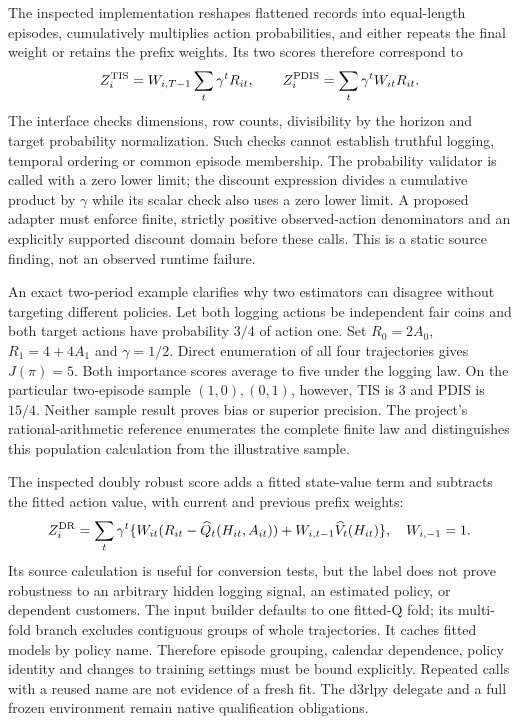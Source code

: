 The inspected implementation reshapes flattened records into equal-length
episodes, cumulatively multiplies action probabilities, and either repeats the
final weight or retains the prefix weights. Its two scores therefore correspond
to
\[
 Z_i^{\rm TIS}=W_{i,T-1}\sum_t\gamma^tR_{it},
 \qquad Z_i^{\rm PDIS}=\sum_t\gamma^tW_{it}R_{it}.
\]
The interface checks dimensions, row counts, divisibility by the horizon and
target probability normalization. Such checks cannot establish truthful
logging, temporal ordering or common episode membership. The probability
validator is called with a zero lower limit; the discount expression divides a
cumulative product by $\gamma$ while its scalar check also uses a zero lower
limit. A proposed adapter must enforce finite, strictly positive observed-action
denominators and an explicitly supported discount domain before these calls.
This is a static source finding, not an observed runtime failure.
\cite{exec23_scope_rl_sources}

An exact two-period example clarifies why two estimators can disagree without
targeting different policies. Let both logging actions be independent fair
coins and both target actions have probability $3/4$ of action one. Set
$R_0=2A_0$, $R_1=4+4A_1$ and $\gamma=1/2$. Direct enumeration of all four
trajectories gives $J(\pi)=5$. Both importance scores average to five under the
logging law. On the particular two-episode sample $(1,0),(0,1)$, however, TIS is
$3$ and PDIS is $15/4$. Neither sample result proves bias or superior precision.
The project's rational-arithmetic reference enumerates the complete finite law
and distinguishes this population calculation from the illustrative sample.
\cite{exec23_scope_rl_reference}

The inspected doubly robust score adds a fitted state-value term and subtracts
the fitted action value, with current and previous prefix weights:
\[
 Z_i^{\rm DR}=\sum_t\gamma^t
 \{W_{it}(R_{it}-\widehat Q_t(H_{it},A_{it}))
       +W_{i,t-1}\widehat V_t(H_{it})\},\quad W_{i,-1}=1.
\]
Its source calculation is useful for conversion tests, but the label does not
prove robustness to an arbitrary hidden logging signal, an estimated policy,
or dependent customers. The input builder defaults to one fitted-Q fold; its
multi-fold branch excludes contiguous groups of whole trajectories. It caches
fitted models by policy name. Therefore episode grouping, calendar dependence,
policy identity and changes to training settings must be bound explicitly.
Repeated calls with a reused name are not evidence of a fresh fit. The d3rlpy
delegate and a full frozen environment remain native qualification obligations.
\cite{exec23_scope_rl_sources}

